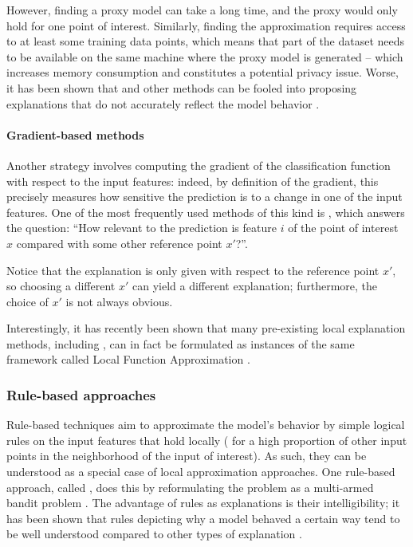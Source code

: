 \documentclass[../main.tex]{subfiles}
\begin{document}
However, finding a proxy model can take a long time, and the proxy would only hold for one point of interest.
Similarly, finding the approximation requires access to at least some training data points, which means that part of the dataset needs to be available on the same machine where the proxy model is generated -- which increases memory consumption and constitutes a potential privacy issue.
Worse, it has been shown that  and other methods can be fooled into proposing explanations that do not accurately reflect the model behavior \cite{slackFooling2020}.

\paragraph{Gradient-based methods}

Another strategy involves computing the gradient of the classification function with respect to the input features: indeed, by definition of the gradient, this precisely measures how sensitive the prediction is to a change in one of the input features.
One of the most frequently used methods of this kind is  \cite{sundararajanAxiomatic2017}, which answers the question: ``How relevant to the prediction is feature $i$ of the point of interest $x$ compared with some other reference point $x'$?''.

Notice that the explanation is only given with respect to the reference point $x'$, so choosing a different $x'$ can yield a different explanation; furthermore, the choice of $x'$ is not always obvious.

Interestingly, it has recently been shown that many pre-existing local explanation methods, including , can in fact be formulated as instances of the same framework called Local Function Approximation \cite{hanWhich2022}.

\subsubsection{Rule-based approaches}

Rule-based techniques aim to approximate the model's behavior by simple logical rules on the input features that hold locally (\ie{} for a high proportion of other input points in the neighborhood of the input of interest).
As such, they can be understood as a special case of local approximation approaches.
One rule-based approach, called , does this by reformulating the problem as a multi-armed bandit problem \cite{ribeiroAnchors2018}.
The advantage of rules as explanations is their intelligibility; it has been shown that rules depicting why a model behaved a certain way tend to be well understood compared to other types of explanation \cite{limWhy2009}.
\end{document}
